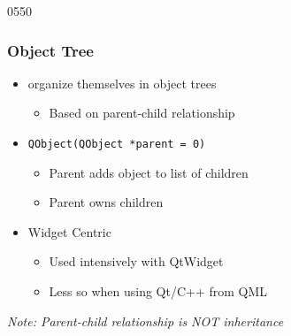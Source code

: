 \begin{slide}{0550} \label{parent_child} \frametitle{Object Tree}
\begin{itemize}
  \item {} organize themselves in object trees
    \begin{itemize}
    \item Based on parent-child relationship
    \end{itemize}
  \item \texttt{QObject(QObject *parent = 0)}
    \begin{itemize}
    \item Parent adds object to list of children
    \item Parent owns children
    \end{itemize}
  \item Widget Centric
    \begin{itemize}
    \item Used intensively with QtWidget
    \item Less so when using Qt/C++ from QML
    \end{itemize}
 \end{itemize}
 \medskip
  \textit{Note: Parent-child relationship is NOT inheritance}
\end{slide}


